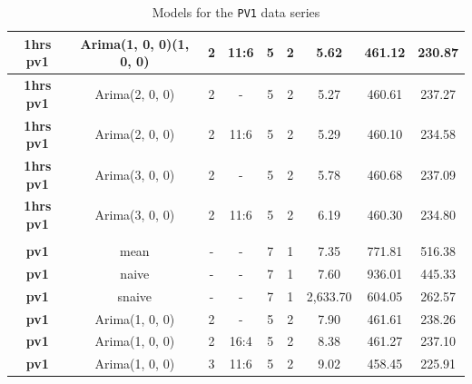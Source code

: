 \documentclass[12pt,a4paper,titlepage]{report}
\begin{document}
\begin{appendices}
\begin{table}[h]
\begin{tabular}{|c|c|c|c|c|c|c|c|c|}
        \textbf{1hrs pv1} & Arima(1, 0, 0)(1, 0, 0) & 2 & 11:6 & 5 & 2 & 5.62     & 461.12 & 230.87 \\ \hline
        \textbf{1hrs pv1} & Arima(2, 0, 0)          & 2 & -    & 5 & 2 & 5.27     & 460.61 & 237.27 \\ \hline
        \textbf{1hrs pv1} & Arima(2, 0, 0)          & 2 & 11:6 & 5 & 2 & 5.29     & 460.10 & 234.58 \\ \hline
        \textbf{1hrs pv1} & Arima(3, 0, 0)          & 2 & -    & 5 & 2 & 5.78     & 460.68 & 237.09 \\ \hline
        \textbf{1hrs pv1} & Arima(3, 0, 0)          & 2 & 11:6 & 5 & 2 & 6.19     & 460.30 & 234.80 \\ \hline
        \textbf{}         &                         &   &      &   &   &          &        &        \\ \hline
        \textbf{pv1}      & mean                    & - & -    & 7 & 1 & 7.35     & 771.81 & 516.38 \\ \hline
        \textbf{pv1}      & naive                   & - & -    & 7 & 1 & 7.60     & 936.01 & 445.33 \\ \hline
        \textbf{pv1}      & snaive                  & - & -    & 7 & 1 & 2,633.70 & 604.05 & 262.57 \\ \hline
        \textbf{pv1}      & Arima(1, 0, 0)          & 2 & -    & 5 & 2 & 7.90     & 461.61 & 238.26 \\ \hline
        \textbf{pv1}      & Arima(1, 0, 0)          & 2 & 16:4 & 5 & 2 & 8.38     & 461.27 & 237.10 \\ \hline
        \textbf{pv1}      & Arima(1, 0, 0)          & 3 & 11:6 & 5 & 2 & 9.02     & 458.45 & 225.91 \\ \hline
    \end{tabular}
    
    \centering
    \caption{Models for the \texttt{PV1} data series}
    \label{pv1results}
\end{table}



\end{appendices}
\end{document}
